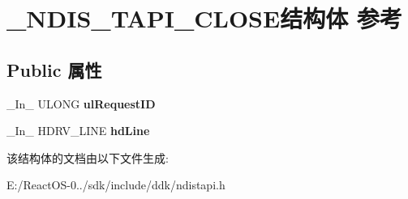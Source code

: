 \hypertarget{struct___n_d_i_s___t_a_p_i___c_l_o_s_e}{}\section{\+\_\+\+N\+D\+I\+S\+\_\+\+T\+A\+P\+I\+\_\+\+C\+L\+O\+S\+E结构体 参考}
\label{struct___n_d_i_s___t_a_p_i___c_l_o_s_e}
\subsection*{Public 属性}
\begin{DoxyCompactItemize}
\item 
\mbox{\label{struct___n_d_i_s___t_a_p_i___c_l_o_s_e_afc1eba0766edd34924a5569e6a4493ee}} 
\+\_\+\+In\+\_\+ U\+L\+O\+NG {\bfseries ul\+Request\+ID}
\item 
\mbox{\label{struct___n_d_i_s___t_a_p_i___c_l_o_s_e_aa47c28149005e9edac1d39f45d4a0411}} 
\+\_\+\+In\+\_\+ H\+D\+R\+V\+\_\+\+L\+I\+NE {\bfseries hd\+Line}
\end{DoxyCompactItemize}


该结构体的文档由以下文件生成\+:\begin{DoxyCompactItemize}
\item 
E\+:/\+React\+O\+S-\/0../sdk/include/ddk/ndistapi.\+h\end{DoxyCompactItemize}
